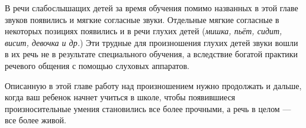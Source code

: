 \documentclass[a5paper]{book}
\renewcommand{\emph}[1]{\textit{#1}}
\begin{document}
В речи слабослышащих детей за время обучения помимо названных в этой
главе звуков появились и мягкие согласные звуки. Отдельные мягкие
согласные в некоторых позициях появились и в речи глухих детей
(\emph{мишка, пьёт, сидит, висит, девочка и др.}) Эти трудные для
произношения глухих детей звуки вошли в их речь не в результате
специального обучения, а вследствие богатой практики речевого общения с
помощью слуховых аппаратов.

Описанную в этой главе работу над произношением нужно продолжать и
дальше, когда ваш ребенок начнет учиться в школе, чтобы появившиеся
произносительные умения становились все более прочными, а речь в целом
--- все более живой.

\clearpage

\tableofcontents
\end{document}
